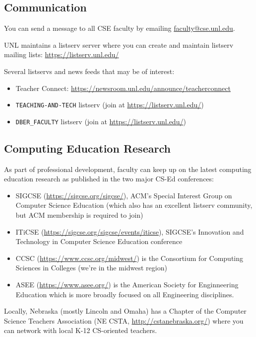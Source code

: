 \documentclass[12pt]{scrartcl}
\begin{document}
\subsection{Communication}

You can send a message to all CSE faculty by emailing 
\href{mailto:faculty@cse.unl.edu}{faculty@cse.unl.edu}. 

UNL maintains a listserv server where you can create and
maintain listserv mailing lists: \url{https://listserv.unl.edu/}

Several listservs and news feeds that may be of interest:
\begin{itemize}
  \item Teacher Connect: \url{https://newsroom.unl.edu/announce/teacherconnect}
  \item \texttt{TEACHING-AND-TECH} listserv (join at \url{https://listserv.unl.edu/})
  \item \texttt{DBER_FACULTY} listserv (join at \url{https://listserv.unl.edu/})
\end{itemize}

\subsection{Computing Education Research}

As part of professional development, faculty can keep up
on the latest computing education research as published in 
the two major CS-Ed conferences:
\begin{itemize}
  \item SIGCSE (\url{https://sigcse.org/sigcse/}), ACM's Special Interest Group on Computer Science Education (which also has an excellent listserv community, but ACM membership is required to join)
  \item ITiCSE (\url{https://sigcse.org/sigcse/events/iticse}), SIGCSE's Innovation and Technology in Computer Science Education conference
  \item CCSC (\url{https://www.ccsc.org/midwest/}) is the Consortium for Computing Sciences in Colleges (we're in the midwest region)
  \item ASEE (\url{https://www.asee.org/}) is the American Society for Enginneering Education which is more broadly focused on all Engineering disciplines.  
\end{itemize}

Locally, Nebraska (mostly Lincoln and Omaha) has a Chapter of the 
Computer Science Teachers Association (NE CSTA, 
\url{http://cstanebraska.org/}) where you can network with local
K-12 CS-oriented teachers.  
\end{document}
